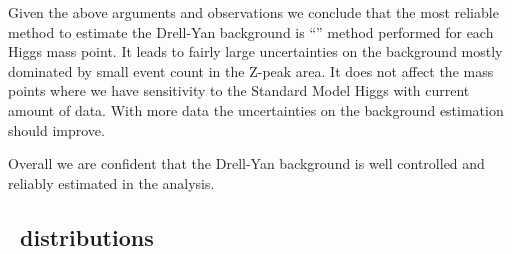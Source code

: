 Given the above arguments and observations we conclude that the most
reliable method to estimate the Drell-Yan background is ``\routin''
method performed for each Higgs mass point. It leads to fairly large
uncertainties on the background mostly dominated by small event count
in the Z-peak area. It does not affect the mass points where we have
sensitivity to the Standard Model Higgs with current amount of
data. With more data the uncertainties on the background estimation
should improve.

Overall we are confident that the Drell-Yan background is well
controlled and reliably estimated in the analysis.

\clearpage
\subsection{\routin\ distributions}
